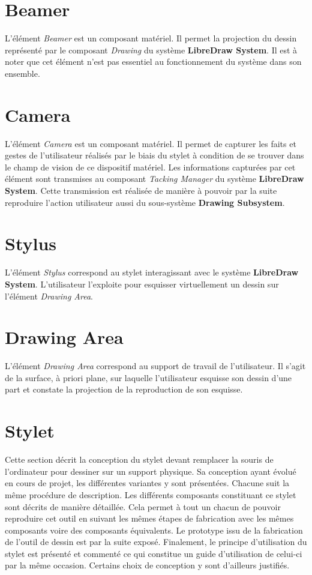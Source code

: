 \documentclass[11pt,a4paper,oldfontcommands]{memoir}
\begin{document}
\newpage

\section{Beamer}

L'élément \textit{Beamer} est un composant matériel. Il permet la projection du dessin représenté par le composant \textit{Drawing} du système \textbf{LibreDraw System}. Il est à noter que cet élément n'est pas essentiel au fonctionnement du système dans son ensemble.

\section{Camera}

L'élément \textit{Camera} est un composant matériel. Il permet de capturer les faits et gestes de l'utilisateur réalisés par le biais du stylet à condition de se trouver dans le champ de vision de ce dispositif matériel. Les informations capturées par cet élément sont transmises au composant \textit{Tacking Manager} du système \textbf{LibreDraw System}. Cette transmission est réalisée de manière à pouvoir par la suite reproduire l'action utilisateur aussi du sous-système \textbf{Drawing Subsystem}.

\section{Stylus}

L'élément \textit{Stylus} correspond au stylet interagissant avec le système \textbf{LibreDraw System}. L'utilisateur l'exploite pour esquisser virtuellement un dessin sur l'élément \textit{Drawing Area}.

\section{Drawing Area}

L'élément \textit{Drawing Area} correspond au support de travail de l'utilisateur. Il s'agit de la surface, à priori plane, sur laquelle l'utilisateur esquisse son dessin d'une part et constate la projection de la reproduction de son esquisse.

\section{Stylet}

Cette section décrit la conception du stylet devant remplacer la souris de l'ordinateur pour dessiner sur un support physique. Sa conception ayant évolué en cours de projet, les différentes variantes y sont présentées. Chacune suit la même procédure de description. Les différents composants constituant ce stylet sont décrits de manière détaillée. Cela permet à tout un chacun de pouvoir reproduire cet outil en suivant les mêmes étapes de fabrication avec les mêmes composants voire des composants équivalents. Le prototype issu de la fabrication de l'outil de dessin est par la suite exposé. Finalement, le principe d'utilisation du stylet est présenté et commenté ce qui constitue un guide d'utilisation de celui-ci par la même occasion. Certains choix de conception y sont d'ailleurs justifiés.
\end{document}
